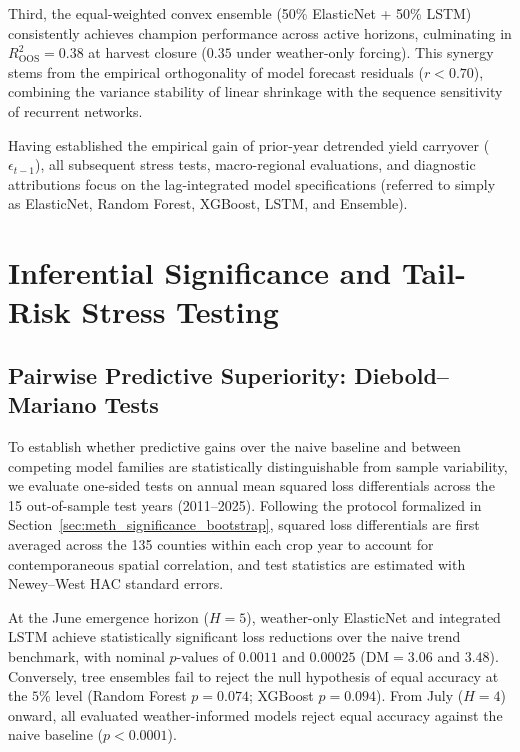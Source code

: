Third, the equal-weighted convex ensemble (50\% ElasticNet + 50\% LSTM) consistently achieves champion performance across active horizons, culminating in $R^2_{\text{OOS}} = 0.38$ at harvest closure ($0.35$ under weather-only forcing). This synergy stems from the empirical orthogonality of model forecast residuals ($r < 0.70$), combining the variance stability of linear shrinkage with the sequence sensitivity of recurrent networks.

Having established the empirical gain of prior-year detrended yield carryover ($\epsilon_{t-1}$), all subsequent stress tests, macro-regional evaluations, and diagnostic attributions focus on the lag-integrated model specifications (referred to simply as ElasticNet, Random Forest, XGBoost, LSTM, and Ensemble).


\section{Inferential Significance and Tail-Risk Stress Testing}
\label{sec:res_significance_tail_risk}

\subsection{Pairwise Predictive Superiority: Diebold--Mariano Tests}
\label{sec:res_significance}

To establish whether predictive gains over the naive baseline and between competing model families are statistically distinguishable from sample variability, we evaluate one-sided \citet{DieboldMariano1995} tests on annual mean squared loss differentials across the 15 out-of-sample test years (2011--2025). Following the protocol formalized in Section~\ref{sec:meth_significance_bootstrap}, squared loss differentials are first averaged across the 135 counties within each crop year to account for contemporaneous spatial correlation, and test statistics are estimated with Newey--West HAC standard errors.

At the June emergence horizon ($H=5$), weather-only ElasticNet and integrated LSTM achieve statistically significant loss reductions over the naive trend benchmark, with nominal $p$-values of $0.0011$ and $0.00025$ ($\text{DM} = 3.06$ and $3.48$). Conversely, tree ensembles fail to reject the null hypothesis of equal accuracy at the $5\%$ level (Random Forest $p=0.074$; XGBoost $p=0.094$). From July ($H=4$) onward, all evaluated weather-informed models reject equal accuracy against the naive baseline ($p < 0.0001$).


